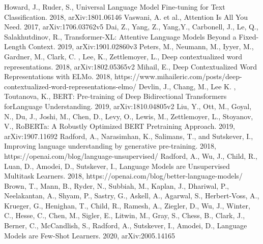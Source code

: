 \documentclass[12pt,german]{report}
\begin{document}

\newpage 
\thispagestyle{empty}
\quad 
\newpage

\tableofcontents
\newpage 
\thispagestyle{empty}
\quad 
\newpage


\newpage 
\thispagestyle{empty}
\quad 
\newpage


\begin{onehalfspace}




\end{onehalfspace}

\listoffigures

\begin{thebibliography}{}
 Howard, J., Ruder, S., Universal Language Model Fine-tuning for Text Classification. 2018,  arXiv:1801.06146 
 Vaswani, A. et al., Attention Is All You Need. 2017,  arXiv:1706.03762v5 
 Dai, Z., Yang, Z., Yang,Y., Carbonell, J., Le, Q., Salakhutdinov, R., Transformer-XL: Attentive Language Models
Beyond a Fixed-Length Context. 2019,  arXiv:1901.02860v3 
 Peters, M.,  Neumann, M.,  Iyyer, M., Gardner, M.,  Clark, C. , Lee, K., Zettlemoyer, L.,  Deep contextualized word representations. 2018, arXiv:1802.05365v2
 Mihail, E., Deep Contextualized Word Representations with ELMo. 2018, https://www.mihaileric.com/posts/deep-contextualized-word-representations-elmo/
 Devlin, J., Chang, M., Lee K. , Toutanova, K., BERT: Pre-training of Deep Bidirectional Transformers forLanguage Understanding. 2019, arXiv:1810.04805v2
 Liu, Y., Ott, M., Goyal, N., Du, J., Joshi, M., Chen, D., Levy, O., Lewis, M., Zettlemoyer, L., Stoyanov, V., RoBERTa: A Robustly Optimized BERT Pretraining Approach. 2019, arXiv:1907.11692
 Radford,  A.,  Narasimhan,  K.,  Salimans,  T.,  and  Sutskever,  I., Improving language understanding by generative pre-training. 2018, https://openai.com/blog/language-unsupervised/
 Radford, A., Wu, J., Child, R., Luan, D., Amodei, D., Sutskever, I., Language Models are Unsupervised Multitask Learners. 2018, https://openai.com/blog/better-language-models/
 Brown, T., Mann, B., Ryder, N., Subbiah, M., Kaplan, J., Dhariwal, P., Neelakantan, A., Shyam, P., Sastry, G., Askell, A., Agarwal, S., Herbert-Voss, A., Krueger, G., Henighan, T., Child, R., Ramesh, A., Ziegler, D., Wu, J., Winter, C., Hesse, C., Chen, M., Sigler, E., Litwin, M., Gray, S., Chess, B., Clark, J., Berner, C., McCandlish, S., Radford, A., Sutskever, I., Amodei, D., Language Models are Few-Shot Learners. 2020,  arXiv:2005.14165 

\end{thebibliography}
\end{document}
